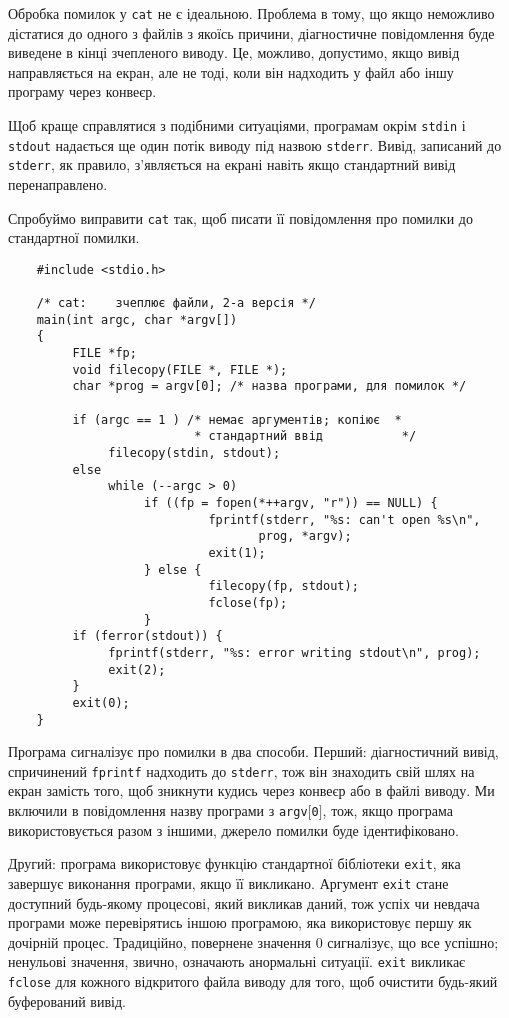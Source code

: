 \documentclass[a4paper,12pt]{book}
\begin{document}
  Обробка помилок у \texttt{cat} не є ідеальною. Проблема в тому, що якщо неможливо
  дістатися до одного з файлів з якоїсь причини, діагностичне повідомлення буде виведене в
  кінці зчепленого виводу. Це, можливо, допустимо, якщо вивід направляється на екран, але
  не тоді, коли він надходить у файл або іншу програму через конвеєр.

  Щоб краще справлятися з подібними ситуаціями, програмам окрім \texttt{stdin} і
  \texttt{stdout} надається ще один потік виводу під назвою \texttt{stderr}. Вивід,
  записаний до \texttt{stderr}, як правило, з'являється на екрані навіть якщо стандартний
  вивід перенаправлено.

  Спробуймо виправити \texttt{cat} так, щоб писати її повідомлення про помилки до
  стандартної помилки.

  \begin{verbatim}
    #include <stdio.h>

    /* cat:    зчеплює файли, 2-а версія */
    main(int argc, char *argv[])
    {
         FILE *fp;
         void filecopy(FILE *, FILE *);
         char *prog = argv[0]; /* назва програми, для помилок */

         if (argc == 1 ) /* немає аргументів; копіює  *
                          * стандартний ввід           */
              filecopy(stdin, stdout);
         else
              while (--argc > 0)
                   if ((fp = fopen(*++argv, "r")) == NULL) {
                            fprintf(stderr, "%s: can't open %s\n",
                                   prog, *argv);
                            exit(1);
                   } else {
                            filecopy(fp, stdout);
                            fclose(fp);
                   }
         if (ferror(stdout)) {
              fprintf(stderr, "%s: error writing stdout\n", prog);
              exit(2);
         }
         exit(0);
    }
  \end{verbatim}

  Програма сигналізує про помилки в два способи. Перший: діагностичний вивід, спричинений
  \texttt{fprintf} надходить до \texttt{stderr}, тож він знаходить свій шлях на екран
  замість того, щоб зникнути кудись через конвеєр або в файлі виводу. Ми включили в
  повідомлення назву програми з \texttt{argv\mbox{$[$}0\mbox{$]$}}, тож, якщо програма використовується
  разом з іншими, джерело помилки буде ідентифіковано.

  Другий: програма використовує функцію стандартної бібліотеки \texttt{exit}, яка завершує
  виконання програми, якщо її викликано. Аргумент \texttt{exit} стане доступний будь-якому
  процесові, який викликав даний, тож успіх чи невдача програми може перевірятись іншою
  програмою, яка використовує першу як дочірній процес. Традиційно, повернене значення 0
  сигналізує, що все успішно; ненульові значення, звично, означають анормальні ситуації.
  \texttt{exit} викликає \texttt{fclose} для кожного відкритого файла виводу для того, щоб
  очистити будь-який буферований вивід.
\end{document}
